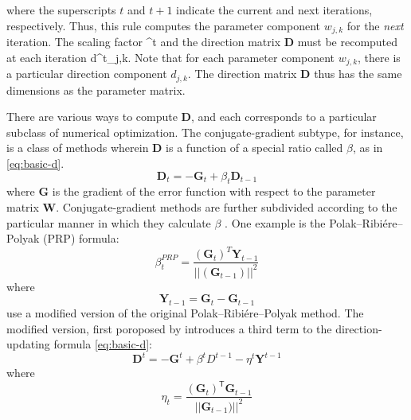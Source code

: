 where the superscripts $t$ and $t+1$ indicate the current and next iterations, respectively. Thus, this rule computes the parameter component $w_{j,k}$ for the \emph{next} iteration. The scaling factor \alpha^{t} and the direction matrix $\textbf{D}$ must be recomputed at each iteration d^{t}_{j,k}. Note that for each parameter component $w_{j,k}$, there is a particular direction component $d_{j,k}$. The direction matrix $\textbf{D}$ thus has the same dimensions as the parameter matrix. 

There are various ways to compute $\textbf{D}$, and each corresponds to a 
particular subclass of numerical optimization. The conjugate-gradient subtype, 
for instance, is a class of methods wherein $\textbf{D}$ is a function 
of a special ratio called $\beta$, as in \eqref{eq:basic-d}. 
\begin{equation}\label{eq:basic-d}
\textbf{D}_{t} = -\textbf{G}_{t}  + \beta_{t} \textbf{D}_{t-1} 
\end{equation}
where \textbf{G} is the gradient of the error function with respect to the parameter matrix $\textbf{W}$.
Conjugate-gradient methods are further subdivided according to the particular manner in which they calculate $\beta$ \citet[For an overview of the available options, see][]{hager:2006}. One example is the Polak--Ribi\'{e}re--Polyak (PRP) formula:
\begin{equation}\label{eq:PRP}
\beta_{t}^{PRP} = \frac{(\textbf{G}_{t})^{T}{\textbf{Y}_{t-1}}}{{||(\textbf{G}_{t-1})||}^2}
\end{equation}
where
\begin{equation}\label{eq:y}
\textbf{Y}_{t-1} = \textbf{G}_{t} - \textbf{G}_{t-1} 
\end{equation}
\citet{cheng-and-li:2012} use a modified version of the original Polak--Ribi\'{e}re--Polyak method. The modified version, first poroposed by \citet{zhang-et-al:2006} introduces a third term to the direction-updating formula \eqref{eq:basic-d}:
\begin{equation}\label{eq:mod-d-update}
\textbf{D}^{t} = -\textbf{G}^{t}  + \beta^{t} D^{t-1} - \eta^{t} \textbf{Y}^{t-1}
\end{equation}
where 
\begin{equation}
\label{eq:eta}
\eta_{t} = \frac{(\textbf{G}_{t})^{\textsf{T}}{\textbf{G}_{t-1}}}{{||\textbf{G}_{t-1})||}^2}
\end{equation}

